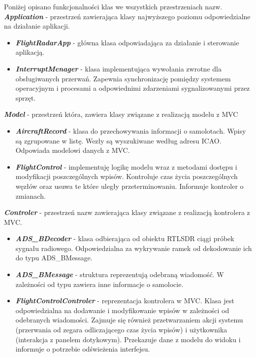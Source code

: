 \documentclass[eng,printmode]{mgr}
\begin{document}
\noindent
Poniżej opisano funkcjonalności klas we wszystkich przestrzeniach nazw.
\\


\noindent
\textbf{\textit{Application}} - przestrzeń zawierająca klasy najwyższego poziomu odpowiedzialne na działanie aplikacji.
\begin{itemize}[label={}]
  \item \textbf{\textit{FlightRadarApp}} - główna klasa odpowiadająca za działanie i sterowanie aplikacją.
  \item \textbf{\textit{InterruptMenager}} - klasa implementująca wywołania zwrotne dla obsługiwanych przerwań. Zapewnia synchronizację pomiędzy systemem operacyjnym i procesami a odpowiednimi zdarzeniami sygnalizowanymi przez sprzęt.
\end{itemize}
\vskip 0.55cm

\noindent
\textbf{\textit{Model}} - przestrzeń która, zawiera klasy związane z realizacją modelu z MVC
\begin{itemize}[label={}]
  \item \textbf{\textit{AircraftRecord}} - klasa do przechowywania informacji o samolotach. Wpisy są zgrupowane w listę. Wezły są wyszukiwane według adresu ICAO. Odpowiada modelowi danych z MVC.
  \item \textbf{\textit{FlightControl}} - implementuję logikę modelu wraz z metodami dostępu i modyfikacji poszczególnych wpisów. Kontroluje czas życia poszczególnych węzłów oraz usuwa te które uległy przeterminowaniu. Informuje kontroler o zmianach.
\end{itemize}
\vskip 0.55cm

\noindent
\textbf{\textit{Controler}} - przestrzeń nazw zawierająca klasy związane z realizacją kontrolera z MVC.
\begin{itemize}[label={}]
  \item \textbf{\textit{ADS\_BDecoder}} - klasa odbierająca od obiektu RTLSDR ciągi próbek sygnału radiowego. Odpowiedzialna za wykrywanie ramek od dekodowanie ich do typu ADS\_BMessage.
  \item \textbf{\textit{ADS\_BMessage}} - struktura reprezentują odebraną wiadomość. W zależności od typu zawiera inne informacje o samolocie.
  \item \textbf{\textit{FlightControlControler}} - reprezentacja kontrolera w MVC. Klasa jest odpowiedzialna na dodawanie i modyfikowanie wpisów w zależności od odebranych wiadomości. Zajmuje się również przetwarzaniem akcji systemu (przerwania od zegara odliczającego czas życia wpisów) i użytkownika (interakcja z panelem dotykowym). Przekazuje dane z modelu do widoku i informuje o potrzebie odświeżenia interfejsu.
\end{itemize}
\vskip 0.55cm
\end{document}
